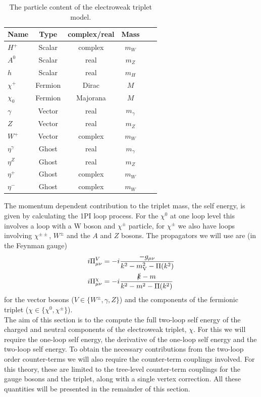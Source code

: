 \documentclass[11pt]{article}
\begin{document}
\begin{table}[h]
 \caption{The particle content of the electroweak triplet model.}\label{tab:particles}
 \vspace{0.3cm}
 \centering 
\begin{tabular}{lccccc}
\hline 
Name & Type & complex/real & Mass  \\ 
\hline \hline 
\(H^+\) & Scalar &complex& $m_W$\\
 \(A^0\) & Scalar &real & $m_Z$\\
 \(h\) & Scalar &real & $m_H$\\
 \hline 
\(\chi^{+}\) & Fermion &Dirac & $M$\\
 \(\chi_0\) & Fermion &Majorana & $M$\\
 \hline 
\(\gamma\) & Vector &real & $m_{\gamma}$\\
 \(Z\) & Vector &real & $m_Z$\\
 \(W^+\) & Vector &complex & $m_W$\\
 \(\eta^{\gamma}\) & Ghost &real & $m_{\gamma}$\\
 \(\eta^Z\) & Ghost &real & $m_Z$\\
 \(\eta^+\) & Ghost &complex & $m_W$\\
 \(\eta^-\) & Ghost &complex & $m_W$\\
 \hline
\end{tabular}
 \end{table}
The momentum dependent contribution to the triplet mass, the self energy, is given by calculating the 1PI loop process.  For the $
\chi^0$ at one loop level this involves a loop with a W boson and $\chi^{\pm}$ particle, for $\chi^{\pm}$ we also have loops involving $
\chi^{\pm\pm}$, $W^{\pm}$ and the $A$ and $Z$ bosons.  The propagators we will use are (in the Feynman gauge)
\begin{align}
i\Pi^{V}_{\mu\nu}&=-i\frac{-g_{\mu\nu}}{k^2-m_{\text{V}}^2- \Pi(k^2)}\label{eqn:gauge_boson_propagator}\\ 
i\Pi^{\chi}_{\mu\nu}&=-i\frac{\slashed{k}-m}{k^2-m^2- \Pi(k^2)}
\end{align}
for the vector bosons ($V\in\{W^{\pm},\gamma,Z\}$) and the components of the fermionic triplet ($\chi\in\{\chi^0,\chi^{\pm}\}$).\\

The aim of this section is to the compute the full two-loop self energy of the charged and neutral components of the electroweak triplet, $\chi$.  For this we will require the one-loop self energy, the derivative of the one-loop self energy and the two-loop self energy.  To obtain the necessary contributions from the two-loop order counter-terms we will also require the counter-term couplings involved.  For this theory, these are limited to the tree-level counter-term couplings for the gauge bosons and the triplet, along with a single vertex correction.  All these quantities will be presented in the remainder of this section.
\end{document}
